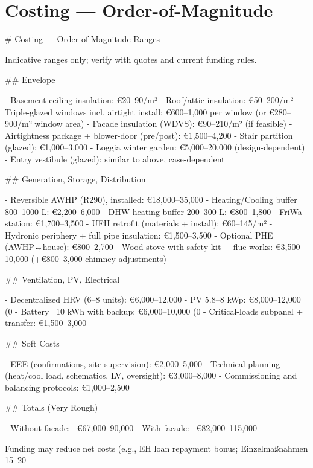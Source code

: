 \documentclass[11pt,oneside]{report}
\begin{document}
\chapter{Costing — Order-of-Magnitude}
\begin{markdown}
# Costing — Order-of-Magnitude Ranges

Indicative ranges only; verify with quotes and current funding rules.

## Envelope

- Basement ceiling insulation: €20–90/m²
- Roof/attic insulation: €50–200/m²
- Triple-glazed windows incl. airtight install: €600–1,000 per window (or €280–900/m² window area)
- Facade insulation (WDVS): €90–210/m² (if feasible)
- Airtightness package + blower-door (pre/post): €1,500–4,200
- Stair partition (glazed): €1,000–3,000
- Loggia winter garden: €5,000–20,000 (design-dependent)
- Entry vestibule (glazed): similar to above, case-dependent

## Generation, Storage, Distribution

- Reversible AWHP (R290), installed: €18,000–35,000
- Heating/Cooling buffer 800–1000 L: €2,200–6,000
- DHW heating buffer 200–300 L: €800–1,800
- FriWa station: €1,700–3,500
- UFH retrofit (materials + install): €60–145/m²
- Hydronic periphery + full pipe insulation: €1,500–3,500
- Optional PHE (AWHP↔house): €800–2,700
- Wood stove with safety kit + flue works: €3,500–10,000 (+€800–3,000 chimney adjustments)

## Ventilation, PV, Electrical

- Decentralized HRV (6–8 units): €6,000–12,000
- PV 5.8–8 kWp: €8,000–12,000 (0%
- Battery ~10 kWh with backup: €6,000–10,000 (0%
- Critical-loads subpanel + transfer: €1,500–3,000

## Soft Costs

- EEE (confirmations, site supervision): €2,000–5,000
- Technical planning (heat/cool load, schematics, LV, oversight): €3,000–8,000
- Commissioning and balancing protocols: €1,000–2,500

## Totals (Very Rough)

- Without facade: ~€67,000–90,000
- With facade: ~€82,000–115,000

Funding may reduce net costs (e.g., EH loan repayment bonus; Einzelmaßnahmen 15–20%
\end{markdown}
\end{document}
